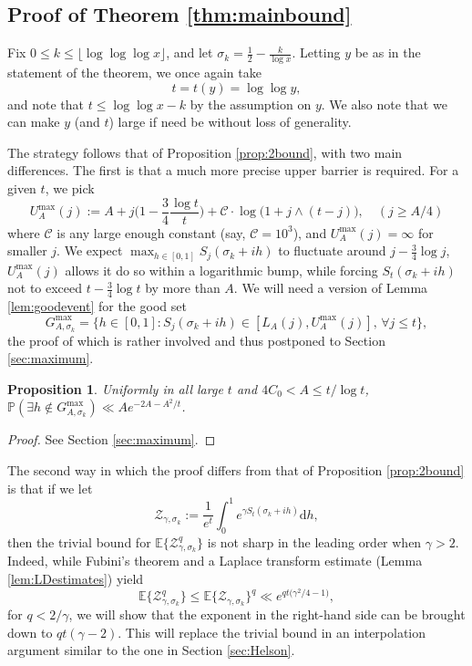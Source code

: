 \documentclass{amsart}
\newtheorem{proposition}[theorem]{Proposition}
\theoremstyle{definition}
\theoremstyle{remark}
\numberwithin{equation}{section}
\begin{document}
\subsection{Proof of Theorem \ref{thm:mainbound}} Fix $0\leq k\leq  \lfloor \log\log\log x\rfloor$, and let $\sigma_k=\frac{1}{2}-\frac{k}{\log x}$. Letting $y$ be as in the statement of the theorem, we once again take
\[
    t=t(y)=\log\log y, 
\]
and note that $ t\leq \log\log x-k$ by the assumption on $y$. We also note that we can make $y$ (and $t$) large if need be without loss of generality.

The strategy follows that of Proposition \ref{prop:2bound}, with two main differences. The first is that a much more precise upper barrier is required. For a given $t$, we pick
\begin{equation}\label{def:Umax}
        U_A^{\text{max}}(j):=A+j\Big(1-\frac{3}{4}\frac{\log t}{t}\Big)+\mathcal{C}\cdot \log\big(1+j\land (t-j)\big),\quad (j\geq A/4)
\end{equation}
where $\mathcal{C}$ is any large enough constant (say, $\mathcal{C}=10^3$), and $ U_A^{\text{max}}(j)=\infty$ for smaller $j$. We expect $\max_{h\in [0,1]} S_j(\sigma_k+ih)$ to fluctuate around $j-\frac{3}{4}\log j$, $ U_A^{\text{max}}(j)$ allows it do so within a logarithmic bump, while forcing $S_t(\sigma_k+ih)$ not to exceed $t-\frac{3}{4}\log t$ by more than $A$. We will need a version of Lemma \ref{lem:goodevent} for the good set
\begin{equation}\label{def:Gmax}
        G_{A,\sigma_k}^{\text{max}}=\{h\in [0,1]: S_j(\sigma_k+ih)\in [L_A(j),U_A^{\text{max}}(j)],\,\forall j\leq t \},
\end{equation}
the proof of which is rather involved and thus postponed to Section \ref{sec:maximum}.
\begin{proposition}\label{prop:maximum} Uniformly in all large $t$ and $4C_0<A\leq t/\log t$, $\mathbb{P}(\exists h\notin G_{A,\sigma_k}^{\mathrm{max}})\ll Ae^{-2A-A^2/t}$.
\end{proposition}
\begin{proof}
    See Section \ref{sec:maximum}.
\end{proof}
The second way in which the proof differs from that of Proposition \ref{prop:2bound} is that if we let
\[
    \mathcal{Z}_{\gamma,\sigma_k}:= \frac{1}{e^t}\int_0^{1}e^{\gamma S_t(\sigma_k+ih)} \mathrm{d}h,
\]
then the trivial bound for $\mathbb{E}\{\mathcal{Z}_{\gamma,\sigma_k}^q\}$ is not sharp in the leading order when $\gamma>2$. Indeed, while Fubini's theorem and a Laplace transform estimate (Lemma \ref{lem:LDestimates}) yield
\begin{equation}\label{eq:trivialsuper}
    \mathbb{E}\big\{\mathcal{Z}_{\gamma,\sigma_k}^q\}\leq \mathbb{E}\big\{ \mathcal{Z}_{\gamma,\sigma_k}\big\}^q\ll e^{qt{(\gamma^2/4-1})},
\end{equation}
for $q<2/\gamma$, we will show that the exponent in the right-hand side can be brought down to $qt(\gamma-2)$. This will replace the trivial bound in an interpolation argument similar to the one in Section \ref{sec:Helson}.
\end{document}
